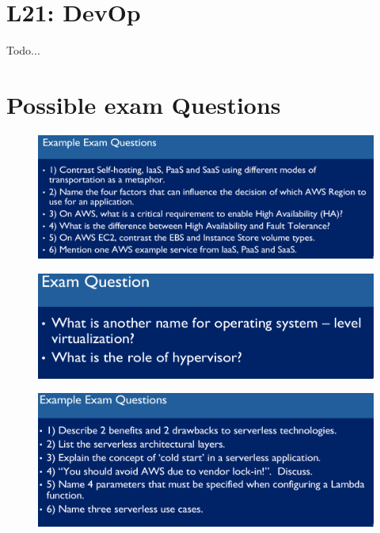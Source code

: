 \documentclass[a4paper]{article}
\begin{document}
\begin{multicols}{3}
\section{L21: DevOp}

Todo...

\section{Possible exam Questions}

\begin{figure}[H]
    \includegraphics[width=\linewidth]{ExampleExamQuestions01.png}
    \label{fig:examquestion01}
\end{figure}

\begin{figure}[H]
    \includegraphics[width=\linewidth]{ExampleExamQuestions02.png}
    \label{fig:examquestion02}
\end{figure}

\begin{figure}[H]
    \includegraphics[width=\linewidth]{ExampleExamQuestions03.png}
    \label{fig:examquestion03}
\end{figure}


\end{multicols}
\end{document}
